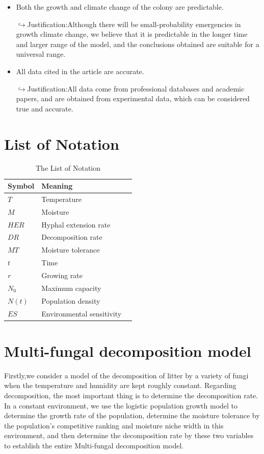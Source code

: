 \documentclass{mcmthesis}
\begin{document}
\begin{itemize}
\item
Both the growth and climate change of the colony are predictable.

$\hookrightarrow$Justification:Although there will be small-probability emergencies in growth climate change, we believe that it is predictable in the longer time and larger range of the model, and the conclusions obtained are suitable for a universal range.

\item
All data cited in the article are accurate.

$\hookrightarrow$Justification:All data come from professional databases and academic papers, and are obtained from experimental data, which can be considered true and accurate.

\end{itemize}

\section{List of Notation}

\begin{table}[h]
	\centering
	\caption{The List of Notation}
	\begin{tabular}{p{}p{}m{}}
		\hline
		Symbol& Meaning \\
		\hline
		$T$      & Temperature\\
		$M$      & Moisture\\
		$HER$	 & Hyphal extension rate\\
		$DR$     & Decomposition rate\\
		$MT$     & Moisture tolerance\\
		$t$      & Time\\
		$r$      & Growing rate\\
		$N_{0}$  & Maximum capacity\\
		$N(t)$   & Population density\\
		$ES$     & Environmental sensitivity\\
		\hline
	\end{tabular}
\end{table}

\section{Multi-fungal decomposition model}
Firstly,we consider a model of the decomposition of litter by a variety of fungi when the temperature and humidity are kept roughly constant. Regarding decomposition, the most important thing is to determine the decomposition rate. In a constant environment, we use the logistic population growth model to determine the growth rate of the population, determine the moisture tolerance by the population’s competitive ranking and moisture niche width in this environment, and then determine the decomposition rate by these two variables to establish the entire Multi-fungal decomposition model.
\end{document}
